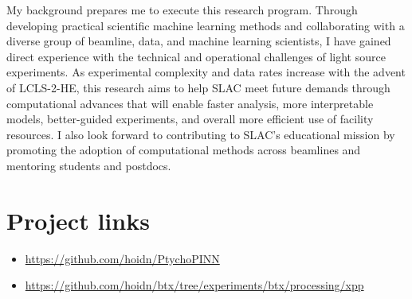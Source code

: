 \documentclass{article}
\begin{document}
My background prepares me to execute this research program. Through developing practical scientific machine learning methods and collaborating with a diverse group of beamline, data, and machine learning scientists, I have gained direct experience with the technical and operational challenges of light source experiments. As experimental complexity and data rates increase with the advent of LCLS-2-HE, this research aims to help SLAC meet future demands through computational advances that will enable faster analysis, more interpretable models, better-guided experiments, and overall more efficient use of facility resources. I also look forward to contributing to SLAC's educational mission by promoting the adoption of computational methods across beamlines and mentoring students and postdocs.

\section{Project links}
\begin{itemize}
\item \url{https://github.com/hoidn/PtychoPINN}
\item \url{https://github.com/hoidn/btx/tree/experiments/btx/processing/xpp}
\end{itemize}

\end{document}
